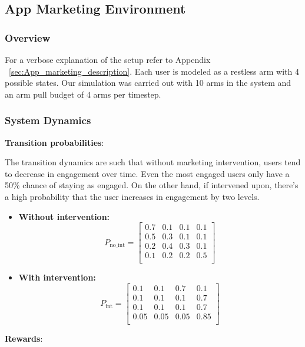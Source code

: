 \documentclass{article} %
\begin{document}
{%
\subsection{App Marketing Environment}\label{sec:App_marketing_appendix}

\subsubsection{Overview}
For a verbose explanation of the setup refer to Appendix ~\ref{sec:App_marketing_description}. Each user is modeled as a restless arm with 4 possible states. Our simulation was carried out   with 10 arms in the system and an arm pull budget of 4 arms per timestep.

\subsubsection{System Dynamics}

\textbf{Transition probabilities}:

The transition dynamics are such that without marketing intervention, users tend to decrease in engagement over time. Even the most engaged users only  have a 50\% chance of staying as engaged. On the other hand, if intervened upon, there's a high probability that the user increases in engagement by two levels.

\begin{itemize}
    \item \textbf{Without intervention:}
    \[
P_{\text{no\_int}} = \begin{bmatrix}
0.7 & 0.1 & 0.1 & 0.1 \\
0.5 & 0.3 & 0.1 & 0.1 \\
0.2 & 0.4 & 0.3 & 0.1 \\
0.1 & 0.2 & 0.2 & 0.5 \\
\end{bmatrix}
\]
    \item \textbf{With intervention:}
    \[
P_{\text{int}} = \begin{bmatrix}
0.1 & 0.1 & 0.7 & 0.1 \\
0.1 & 0.1 & 0.1 & 0.7 \\
0.1 & 0.1 & 0.1 & 0.7 \\
0.05 & 0.05 & 0.05 & 0.85 \\
\end{bmatrix}
\]
\end{itemize}


\textbf{Rewards}:

}
\end{document}

